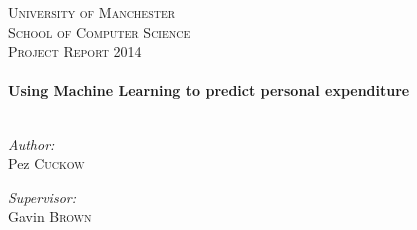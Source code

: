 \begin{titlepage}
\begin{center}

\textsc{\LARGE University of Manchester}\\[1.5cm]
\textsc{\Large School of Computer Science\\Project Report 2014}\\[0.5cm]

\HRule \\[0.4cm]
{ \huge \bfseries Using Machine Learning to predict personal expenditure \\[0.4cm] }
\HRule \\[1.5cm]

\begin{minipage}{0.4\textwidth}
\begin{flushleft} \large
\emph{Author:}\\
Pez \textsc{Cuckow}
\end{flushleft}
\end{minipage}
\begin{minipage}{0.4\textwidth}
\begin{flushright} \large
\emph{Supervisor:} \\
Gavin \textsc{Brown}
\end{flushright}
\end{minipage}

\vfill


\end{center}
\end{titlepage}